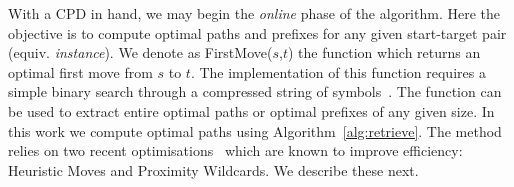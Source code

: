 %



With a CPD in hand, we may begin the {\em online} phase of the algorithm.
Here the objective is to compute optimal paths and prefixes for any given
start-target pair (equiv. {\em instance}).
We denote as \textsf{FirstMove}($s$,$t$) the function which returns an 
optimal first move from $s$ to $t$.
The implementation of this function requires a simple binary 
search through a compressed string of symbols~\cite{strasser-et-al-2014}.
The function can be used to extract entire optimal paths or optimal
prefixes of any given size.
In this work we compute optimal paths using Algorithm~\ref{alg:retrieve}. 
The method relies on two recent 
optimisations~\cite{icaps19b} which are known to improve efficiency: 
Heuristic Moves and Proximity Wildcards. We describe these next.

